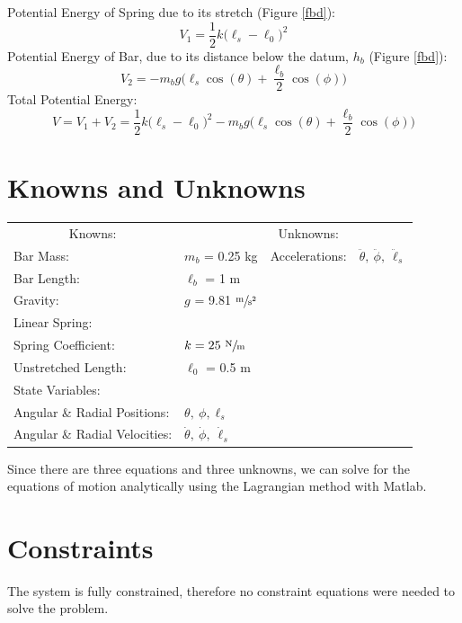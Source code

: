 \documentclass[12pt]{report}
\begin{document}
\begin{flushleft}
Potential Energy of Spring due to its stretch (Figure \ref{fbd}):
$$V_1 = \frac{1}{2}k\big(\ell_s-\ell_0\big)^2$$
Potential Energy of Bar, due to its distance below the datum, $h_{b}$ (Figure \ref{fbd}):
$$V_2 = - m_bg\big(\ell_s\cos(\theta) + \frac{\ell_b}{2}\cos(\phi)\big)$$
Total Potential Energy:
\begin{equation}
V = V_1 + V_2 = \frac{1}{2}k\big(\ell_s-\ell_0\big)^2 - m_bg\big(\ell_s\cos(\theta) + \frac{\ell_b}{2}\cos(\phi)\big)
\end{equation}
\newpage
\section{Knowns and Unknowns} \label{knownsandunknowns}
\begin{tabular}{ll@{\hskip .75in}ll}
  \multicolumn{1}{c}{Knowns:} && \multicolumn{1}{c}{Unknowns:} \\
  Bar Mass: &$m_b$ = 0.25 kg & Accelerations: & $\ddot{\theta},~\ddot{\phi},~\ddot{\ell}_s$ \\
  Bar Length: &$\ell_b$ = 1 m & \\
  Gravity: &$g$ = 9.81 $\sfrac{\text{m}}{\text{s$^2$}}$& \\
  Linear Spring: \\
  \quad Spring Coefficient:& $k = 25~\sfrac{\text{N}}{\text{m}}$\\
  \quad Unstretched Length:& $\ell_0$ = 0.5 m \\
  State Variables: \\
  \quad Angular \& Radial Positions: &$\theta,~\phi,\ell_s$ \\
  \quad Angular \& Radial Velocities: &$\dot{\theta},~\dot{\phi},~\dot{\ell}_s$ & \\
\end{tabular}
\vspace{2ex}

Since there are three equations and three unknowns, we can solve for the equations of
motion analytically using the Lagrangian method with Matlab.

\section{Constraints}
The system is fully constrained, therefore no constraint equations were needed to
solve the problem.

\end{flushleft}
\end{document}
